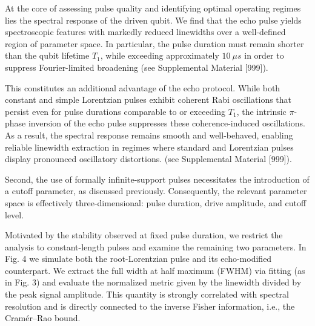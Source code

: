 


At the core of assessing pulse quality and identifying optimal operating regimes lies the spectral response of the driven qubit. We find that the echo pulse yields spectroscopic features with markedly reduced linewidths over a well-defined region of parameter space. In particular, the pulse duration must remain shorter than the qubit lifetime $T_1$, while exceeding approximately $10~\mu s$ in order to suppress Fourier-limited broadening (see Supplemental Material [999]).

This constitutes an additional advantage of the echo protocol. While both constant and simple Lorentzian pulses exhibit coherent Rabi oscillations that persist even for pulse durations comparable to or exceeding $T_1$, the intrinsic $\pi$-phase inversion of the echo pulse suppresses these coherence-induced oscillations. As a result, the spectral response remains smooth and well-behaved, enabling reliable linewidth extraction in regimes where standard and Lorentzian pulses display pronounced oscillatory distortions. (see Supplemental Material [999]).

Second, the use of formally infinite-support pulses necessitates the introduction of a cutoff parameter, as discussed previously. Consequently, the relevant parameter space is effectively three-dimensional: pulse duration, drive amplitude, and cutoff level.

Motivated by the stability observed at fixed pulse duration, we restrict the analysis to constant-length pulses and examine the remaining two parameters. In Fig. 4 we simulate both the root-Lorentzian pulse and its echo-modified counterpart. We extract the full width at half maximum (FWHM) via fitting (as in Fig. 3) and evaluate the normalized metric given by the linewidth divided by the peak signal amplitude. This quantity is strongly correlated with spectral resolution and is directly connected to the inverse Fisher information, i.e., the Cramér–Rao bound.

